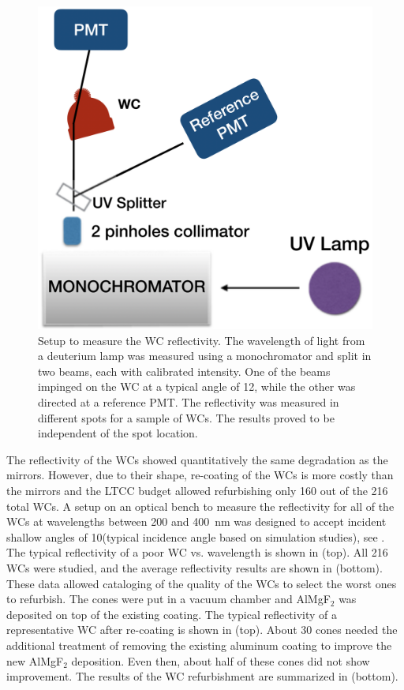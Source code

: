 \begin{figure}
	\centering
	\includegraphics[width=0.98\columnwidth,keepaspectratio]{img/wcSetup.png}
	\caption{Setup to measure the WC reflectivity. The wavelength of light from a deuterium lamp was measured
          using a monochromator and split in two beams, each with calibrated intensity. One of the beams impinged on
          the WC at a typical angle of 12\mdeg, while the other was directed at a reference PMT. The reflectivity was
          measured in different spots for a sample of WCs.  The results proved to be independent of the spot location.}
	\label{fig:wcSetup}
\end{figure}

The reflectivity of the WCs showed quantitatively the same degradation as the mirrors. However, due to their shape,
re-coating of the WCs is more costly than the mirrors and the LTCC budget allowed refurbishing only 160 out of the
216 total WCs. A setup on an optical bench to measure the reflectivity for all of the WCs at wavelengths between 200
and 400~nm was designed to accept incident shallow angles of 10\mdeg (typical incidence angle based on
simulation studies), see . The typical reflectivity of a poor WC vs. wavelength is shown in 
(top). All 216 WCs were studied, and the average reflectivity results are shown in  (bottom). These
data allowed cataloging of the quality of the WCs to select the worst ones to refurbish. The cones were put in a vacuum
chamber and AlMgF$_2$ was deposited on top of the existing coating. The typical reflectivity of a representative WC
after re-coating is shown in  (top). About 30 cones needed the additional treatment of removing the
existing aluminum coating to improve the new AlMgF$_2$ deposition. Even then, about half of these cones did not show
improvement. The results of the WC refurbishment are summarized in  (bottom).

